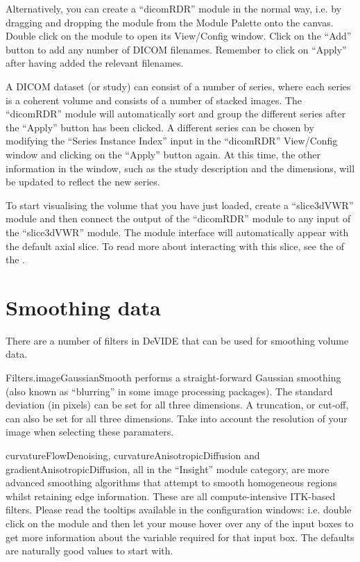 Alternatively, you can create a ``dicomRDR'' module in the normal way,
i.e. by dragging and dropping the module from the Module Palette onto
the canvas.  Double click on the module to open its View/Config
window.  Click on the ``Add'' button to add any number of DICOM
filenames.  Remember to click on ``Apply'' after having added the
relevant filenames.

A DICOM dataset (or study) can consist of a number of series, where
each series is a coherent volume and consists of a number of stacked
images.  The ``dicomRDR'' module will automatically sort and group the
different series after the ``Apply'' button has been clicked.  A
different series can be chosen by modifying the ``Series Instance
Index'' input in the ``dicomRDR'' View/Config window and clicking on
the ``Apply'' button again.  At this time, the other information in
the window, such as the study description and the dimensions, will be
updated to reflect the new series.

To start visualising the volume that you have just loaded, create a
``slice3dVWR'' module and then connect the output of the ``dicomRDR''
module to any input of the ``slice3dVWR'' module.  The module
interface will automatically appear with the default axial slice.  To
read more about interacting with this slice, see the  of the .

\section{Smoothing data}
There are a number of filters in DeVIDE that can be used for smoothing
volume data.

Filters.imageGaussianSmooth performs a straight-forward Gaussian
smoothing (also known as ``blurring'' in some image processing
packages).  The standard deviation (in pixels) can be set for all
three dimensions.  A truncation, or cut-off, can also be set for all
three dimensions.  Take into account the resolution of your image when
selecting these paramaters.

curvatureFlowDenoising, curvatureAnisotropicDiffusion and
gradientAnisotropicDiffusion, all in the ``Insight'' module category,
are more advanced smoothing algorithms that attempt to smooth
homogeneous regions whilst retaining edge information.  These are all
compute-intensive ITK-based filters.  Please read the tooltips
available in the configuration windows: i.e. double click on the
module and then let your mouse hover over any of the input boxes to
get more information about the variable required for that input box.
The defaults are naturally good values to start with.

